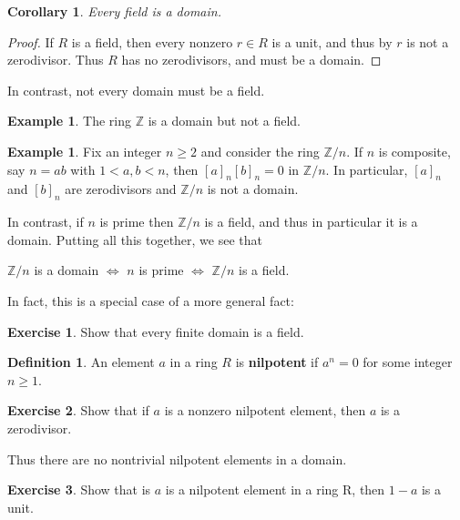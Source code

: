\documentclass[12pt]{report}
\newtheorem{corollary}[theorem]{Corollary}
\numberwithin{equation}{section}
\numberwithin{theorem}{chapter}
\theoremstyle{definition}
\newtheorem{definition}[theorem]{Definition}
\newtheorem{example}[theorem]{Example}
\newtheorem{exercise}{Exercise}
\newtheorem*{basic properties}{Basic Properties}
\newtheorem*{Important Remark}{Important Remark}
\newcommand{\Z}{\mathbb{Z}}
\begin{document}
\begin{corollary}\label{field implies domain}
	Every field is a domain.
\end{corollary}

\begin{proof}
	If $R$ is a field, then every nonzero $r \in R$ is a unit, and thus by  $r$ is not a zerodivisor. Thus $R$ has no zerodivisors, and must be a domain.
\end{proof}

In contrast, not every domain must be a field.


\begin{example}
The ring $\Z$ is a domain but not a field. 
\end{example}
 
\begin{example}
Fix an integer $n \geqslant 2$ and consider the ring $\Z/n$. If $n$ is composite, say $n = ab$ with $1 < a, b < n$, then $[a]_n[b]_n = 0$ in $\Z/n$. In particular, $[a]_n$ and $[b]_n$ are zerodivisors and $\Z/n$ is not a domain.

In contrast, if $n$ is prime then $\Z/n$ is a field, and thus in particular it is a domain. Putting all this together, we see that 

\begin{center}
	$\Z/n$ is a domain $\iff$ $n$ is prime $\iff$ $\Z/n$ is a field.
\end{center}
\end{example}


In fact, this is a special case of a more general fact:

\begin{exercise}
	Show that every finite domain is a field.
\end{exercise}


\begin{definition}
An element $a$ in a ring $R$ is {\bf nilpotent} if $a^n = 0$ for some integer $n \geqslant 1$. 
\end{definition}

\begin{exercise}
	Show that if $a$ is a nonzero nilpotent element, then $a$ is a zerodivisor.
\end{exercise}

Thus there are no nontrivial nilpotent elements in a domain.

\begin{exercise}\label{1-nilpotent is a unit}
Show that is $a$ is a nilpotent element in a ring R, then $1-a$ is a unit.
\end{exercise}
\end{document}
